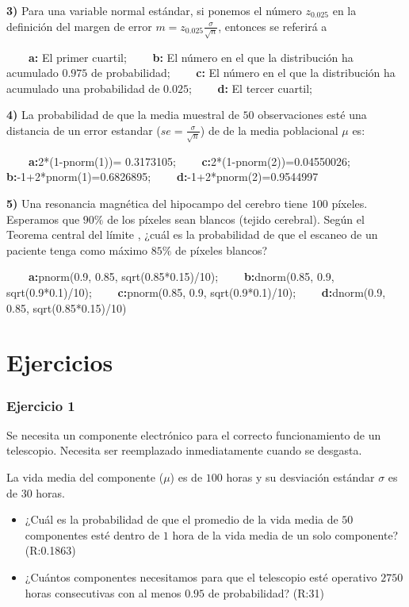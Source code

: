 \documentclass[
]{book}
\begin{document}
\textbf{3)} Para una variable normal estándar, si ponemos el número \(z_{0.025}\) en la definición del margen de error \(m=z_{0.025} \frac{\sigma}{\sqrt{n}}\), entonces se referirá a

\textbf{\(\qquad\)a:} El primer cuartil; \textbf{\(\qquad\)b:} El número en el que la distribución ha acumulado \(0.975\) de probabilidad; \textbf{\(\qquad\)c:} El número en el que la distribución ha acumulado una probabilidad de \(0.025\); \textbf{\(\qquad\)d:} El tercer cuartil;

\textbf{4)} La probabilidad de que la media muestral de \(50\) observaciones esté una distancia de un error estandar (\(se=\frac{\sigma}{\sqrt{n}}\)) de de la media poblacional \(\mu\) es:

\textbf{\(\qquad\)a:}2*(1-pnorm(1))= 0.3173105; \textbf{\(\qquad\)c:}2*(1-pnorm(2))=0.04550026;
\textbf{\(\qquad\)b:}-1+2*pnorm(1)=0.6826895;
\textbf{\(\qquad\)d:}-1+2*pnorm(2)=0.9544997

\textbf{5)} Una resonancia magnética del hipocampo del cerebro tiene \(100\) píxeles. Esperamos que \(90\%\) de los píxeles sean blancos (tejido cerebral). Según el Teorema central del límite , ¿cuál es la probabilidad de que el escaneo de un paciente tenga como máximo \(85\%\) de píxeles blancos?

\textbf{\(\qquad\)a:}pnorm(0.9, 0.85, sqrt(0.85*0.15)/10); \textbf{\(\qquad\)b:}dnorm(0.85, 0.9,
sqrt(0.9*0.1)/10); \textbf{\(\qquad\)c:}pnorm(0.85, 0.9, sqrt(0.9*0.1)/10); \textbf{\(\qquad\)d:}dnorm(0.9, 0.85, sqrt(0.85*0.15)/10)

\hypertarget{ejercicios-9}{%
\section{Ejercicios}\label{ejercicios-9}}

\hypertarget{ejercicio-1-8}{%
\subsubsection{Ejercicio 1}\label{ejercicio-1-8}}

Se necesita un componente electrónico para el correcto funcionamiento de un telescopio. Necesita ser reemplazado inmediatamente cuando se desgasta.

La vida media del componente (\(\mu\)) es de \(100\) horas y su desviación estándar \(\sigma\) es de \(30\) horas.

\begin{itemize}
\item
  ¿Cuál es la probabilidad de que el promedio de la vida media de \(50\) componentes esté dentro de \(1\) hora de la vida media de un solo componente? (R:0.1863)
\item
  ¿Cuántos componentes necesitamos para que el telescopio esté operativo \(2750\) horas consecutivas con al menos \(0.95\) de probabilidad? (R:31)
\end{itemize}
\end{document}
